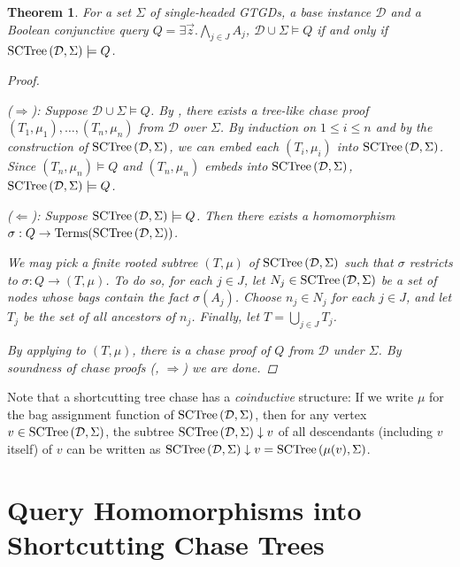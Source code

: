 \documentclass[12pt]{report}
\theoremstyle{plain}
\newtheorem{theorem}{Theorem}[chapter]
\theoremstyle{definition}
\def\Terms{{\mathrm{Terms}}}
\newcommand{\SCTree}[2]{\ensuremath{\normalfont{\textrm{SCTree}} \left( #1, #2 \right)}}
\begin{document}
\begin{theorem}
\label{sctree-soundness-completeness}
  For a set $\Sigma$ of single-headed GTGDs, a base instance $\mathcal{D}$ and a Boolean conjunctive query $Q = \exists \vec{z}. \bigwedge_{j \in J} A_j$, $\mathcal{D} \cup \Sigma \models Q$ if and only if $\SCTree{\mathcal{D}}{\Sigma} \models Q$.
  \begin{proof}[Proof] $ $\par
    ($\Longrightarrow$): Suppose $\mathcal{D} \cup \Sigma \models Q$. By , there exists a tree-like chase proof $(T_1, \mu_1), \ldots, (T_n, \mu_n)$ from $\mathcal{D}$ over $\Sigma$. By induction on $1 \leq i \leq n$ and by the construction of $\SCTree{\mathcal{D}}{\Sigma}$, we can embed each $(T_i, \mu_i)$ into $\SCTree{\mathcal{D}}{\Sigma}$. Since $(T_n, \mu_n) \models Q$ and $(T_n, \mu_n)$ embeds into $\SCTree{\mathcal{D}}{\Sigma}$, $\SCTree{\mathcal{D}}{\Sigma} \models Q$.

    ($\Longleftarrow$): Suppose $\SCTree{\mathcal{D}}{\Sigma} \models Q$. Then there exists a homomorphism $\sigma:\nobreak Q \rightarrow \Terms(\SCTree{\mathcal{D}}{\Sigma})$.
    
    We may pick a finite rooted subtree $(T, \mu)$ of $\SCTree{\mathcal{D}}{\Sigma}$ such that $\sigma$ restricts to $\sigma: Q \rightarrow (T, \mu)$. To do so, for each $j \in J$, let $N_j \in \SCTree{\mathcal{D}}{\Sigma}$ be a set of nodes whose bags contain the fact $\sigma(A_j)$. Choose $n_j \in N_j$ for each $j \in J$, and let $T_j$ be the set of all ancestors of $n_j$. Finally, let $T = \bigcup_{j \in J} T_j$.

    By applying  to $(T, \mu)$, there is a chase proof of $Q$ from $\mathcal{D}$ under $\Sigma$. By soundness of chase proofs (, $\Longrightarrow$) we are done.
  \end{proof}
\end{theorem}

Note that a shortcutting tree chase has a \emph{coinductive} structure: If we write $\mu$ for the bag assignment function of $\SCTree{\mathcal{D}}{\Sigma}$, then for any vertex $v \in \SCTree{\mathcal{D}}{\Sigma}$, the subtree $\SCTree{\mathcal{D}}{\Sigma} \downarrow v$ of all descendants (including $v$ itself) of $v$ can be written as $\SCTree{\mathcal{D}}{\Sigma} \downarrow v = \SCTree{\mu(v)}{\Sigma}$.

\section{Query Homomorphisms into Shortcutting Chase Trees}
\end{document}
